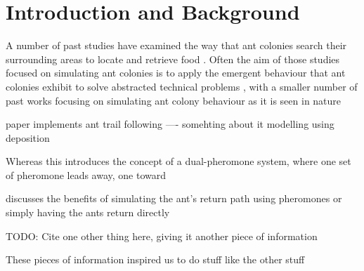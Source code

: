 \section{Introduction and Background}
		


		A number of past studies have examined the way that ant colonies search their surrounding areas to locate and retrieve food \cite{vittori_modeling_2004, 1}.
		Often the aim of those studies focused on simulating ant colonies is to apply the emergent behaviour that ant colonies exhibit to solve abstracted technical
		problems \cite{2, 3}, with a smaller number of past works focusing on simulating ant colony behaviour as it is seen in nature \cite{4} %
		
		\cite{4} paper implements ant trail following  ---- somehting about it modelling using deposition
		
		Whereas this \cite{1} introduces the concept of a dual-pheromone system, where one set of pheromone leads away, one toward
		
		\cite{5} discusses the benefits of simulating the ant's return path using pheromones or simply having the ants return directly

		TODO: Cite one other thing here, giving it another piece of information

		These pieces of information inspired us to do stuff like the other stuff